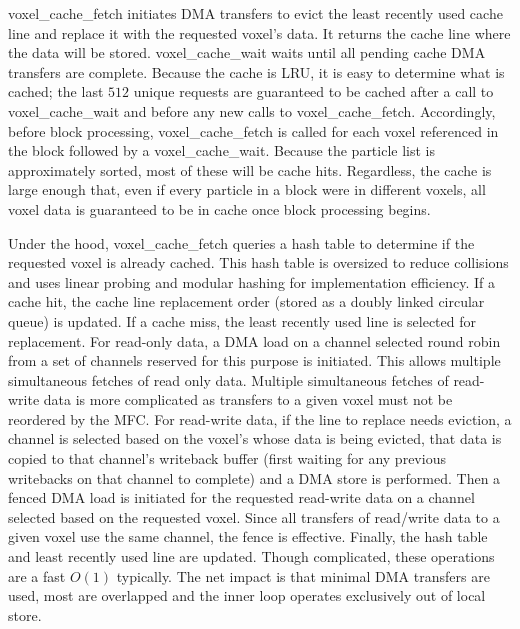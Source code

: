 \documentclass[10pt]{article}
\begin{document}
voxel\_cache\_fetch initiates DMA transfers to evict the least
recently used cache line and replace it with the requested voxel's
data.  It returns the cache line where the data will be stored.
voxel\_cache\_wait waits until all pending cache DMA transfers are
complete.  Because the cache is LRU, it is easy to determine what is
cached; the last $512$ unique requests are guaranteed to be cached
after a call to voxel\_cache\_wait and before any new calls to
voxel\_cache\_fetch.  Accordingly, before block processing,
voxel\_cache\_fetch is called for each voxel referenced in the block
followed by a voxel\_cache\_wait.  Because the particle list is
approximately sorted, most of these will be cache hits.  Regardless,
the cache is large enough that, even if every particle in a block were
in different voxels, all voxel data is guaranteed to be in cache once
block processing begins.

Under the hood, voxel\_cache\_fetch queries a hash table to determine
if the requested voxel is already cached.  This hash table is
oversized to reduce collisions and uses linear probing and modular
hashing for implementation efficiency.  If a cache hit, the cache line
replacement order (stored as a doubly linked circular queue) is
updated.  If a cache miss, the least recently used line is selected
for replacement.  For read-only data, a DMA load on a channel selected
round robin from a set of channels reserved for this purpose is
initiated.  This allows multiple simultaneous fetches of read only
data.  Multiple simultaneous fetches of read-write data is more
complicated as transfers to a given voxel must not be reordered by the
MFC.  For read-write data, if the line to replace needs eviction, a
channel is selected based on the voxel's whose data is being evicted,
that data is copied to that channel's writeback buffer (first waiting
for any previous writebacks on that channel to complete) and a DMA
store is performed.  Then a fenced DMA load is initiated for the
requested read-write data on a channel selected based on the requested
voxel.  Since all transfers of read/write data to a given voxel use
the same channel, the fence is effective.  Finally, the hash table and
least recently used line are updated.  Though complicated, these
operations are a fast $O(1)$ typically.  The net impact is that minimal 
DMA transfers are used, most are overlapped and the inner
loop operates exclusively out of local store.

\end{document}
